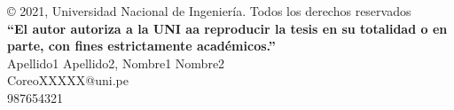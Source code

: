\begin{permisos}

	\onehalfspacing  %
	
	© 2021, Universidad Nacional de Ingeniería. Todos los derechos reservados \\
	\textbf{``El autor autoriza a la UNI aa reproducir la tesis en su totalidad o en parte, con fines estrictamente académicos.''} \\
	Apellido1 Apellido2, Nombre1 Nombre2 \\
	CoreoXXXXX@uni.pe \\
	987654321
	
	\singlespacing  %
	
\end{permisos}
